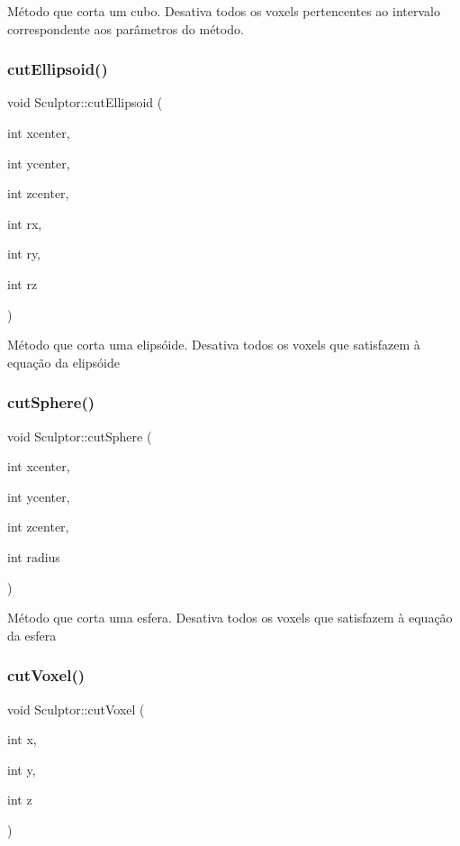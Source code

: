 Método que corta um cubo. Desativa todos os voxels pertencentes ao intervalo correspondente aos parâmetros do método. \mbox{\label{classSculptor_a18d2922c111c4c13653ee07d878151ad}} 
\subsubsection{\texorpdfstring{cutEllipsoid()}{cutEllipsoid()}}
{\footnotesize\ttfamily void Sculptor\+::cut\+Ellipsoid (\begin{DoxyParamCaption}\item[{int}]{xcenter,  }\item[{int}]{ycenter,  }\item[{int}]{zcenter,  }\item[{int}]{rx,  }\item[{int}]{ry,  }\item[{int}]{rz }\end{DoxyParamCaption})}

Método que corta uma elipsóide. Desativa todos os voxels que satisfazem à equação da elipsóide \mbox{\label{classSculptor_a67ab8c0ba5116adb8af1d01ad373ac15}} 
\subsubsection{\texorpdfstring{cutSphere()}{cutSphere()}}
{\footnotesize\ttfamily void Sculptor\+::cut\+Sphere (\begin{DoxyParamCaption}\item[{int}]{xcenter,  }\item[{int}]{ycenter,  }\item[{int}]{zcenter,  }\item[{int}]{radius }\end{DoxyParamCaption})}

Método que corta uma esfera. Desativa todos os voxels que satisfazem à equação da esfera \mbox{\label{classSculptor_ad9d714a35fc8ae16d06eb5df37c3493c}} 
\subsubsection{\texorpdfstring{cutVoxel()}{cutVoxel()}}
{\footnotesize\ttfamily void Sculptor\+::cut\+Voxel (\begin{DoxyParamCaption}\item[{int}]{x,  }\item[{int}]{y,  }\item[{int}]{z }\end{DoxyParamCaption})}

